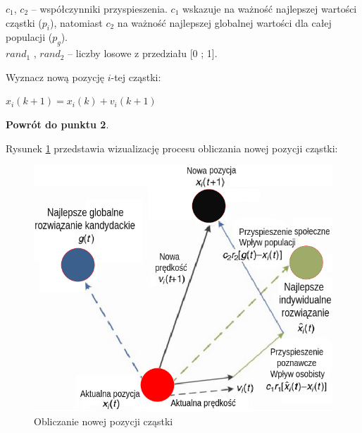 \begin{enumerate*}
\begin{enumerate*}
$c_1$, $c_2$ -- współczynniki przyspieszenia. $c_1$ wskazuje na ważność najlepszej wartości cząstki ($p_i$), natomiast $c_2$ na ważność najlepszej globalnej wartości dla całej populacji ($p_g$). \\
$rand_1$ , $rand_2$  -- liczby losowe z przedziału [0 ; 1].
\item Wyznacz nową pozycję $i$-tej cząstki:
\begin{center}
\begin{Large}
$x_i(k+1) = x_i(k) + v_i(k+1)$
\end{Large}
\end{center}
\end{enumerate*}
\item \textbf{Powrót do punktu 2}.
\end{enumerate*}

Rysunek \ref{ParticleNewPosition} przedstawia wizualizację procesu obliczania nowej pozycji cząstki:
\vspace{0.5cm}
\begin{figure}[H]
\centering
\includegraphics[width=15cm]{resources/figures/particle_new_pos.png}
\caption{Obliczanie nowej pozycji cząstki}
\label{ParticleNewPosition}
\end{figure}
